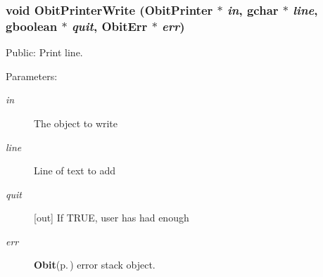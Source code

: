 \subsubsection{\setlength{\rightskip}{0pt plus 5cm}void Obit\-Printer\-Write ({\bf Obit\-Printer} $\ast$ {\em in}, gchar $\ast$ {\em line}, gboolean $\ast$ {\em quit}, {\bf Obit\-Err} $\ast$ {\em err})}\label{ObitPrinter_8c_a12}


Public: Print line. 

\begin{Desc}
\item[Parameters:]
\begin{description}
\item[{\em in}]The object to write \item[{\em line}]Line of text to add \item[{\em quit}][out] If TRUE, user has had enough \item[{\em err}]{\bf Obit}{\rm (p.\,\pageref{structObit})} error stack object. \end{description}
\end{Desc}
